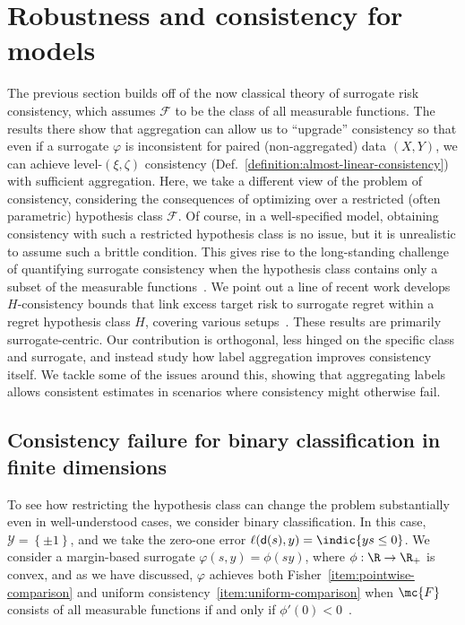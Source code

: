 \documentclass[11pt]{article}
\newcommand{\pred}{\mathsf{d}}  %
\newcommand{\tloss}{\ell}  %
\newcommand{\sloss}{\varphi}  %
\begin{document}
\section{Robustness and consistency for models}

The previous section builds off of the now classical theory of surrogate
risk consistency, which assumes $\mathcal{F}$ to be the class of all
measurable functions.
%
The results there show that aggregation can allow us to ``upgrade''
consistency so that even if a surrogate $\sloss$ is inconsistent for paired
(non-aggregated) data $(X,Y)$, we can achieve level-$(\xi, \zeta)$
consistency (Def.~\ref{definition:almost-linear-consistency}) with
sufficient aggregation.
%
Here, we take a different view of the problem of consistency,
considering the consequences of optimizing over a restricted (often
parametric) hypothesis class $\mathcal{F}$.
%
Of course, in a well-specified model, obtaining consistency with such a
restricted hypothesis class is no issue, but it is unrealistic to
assume such a brittle condition.
%
This gives rise to the long-standing challenge of quantifying surrogate
consistency when the hypothesis class contains only a subset of the
measurable functions~\citep{DuchiKhRu16, NguyenWaJo09}. 
%
We point out a line of recent work develops $H$-consistency bounds that link excess target risk to surrogate regret 
within a regret hypothesis class $H$, covering various setups~\citep{AwasthiMaMoZh22,
AwasthiMaMoZh22b, MaoMoZh23, MaoMoZh24, MaoMoZh25}. These results are primarily surrogate-centric. Our contribution is orthogonal,
less hinged on the specific class and surrogate, and instead study how label aggregation improves consistency itself.
%
We tackle some of the issues around this, showing that
aggregating labels allows consistent estimates in scenarios where
consistency might otherwise fail.

\subsection{Consistency failure for binary classification in
  finite dimensions}
\label{sec:binary-finite-dim}

To see how restricting the hypothesis class can change the problem
substantially even in well-understood cases, we consider binary
classification.
%
In this case, $\mathcal{Y} = \left\{\pm 1\right\}$, and
we take the zero-one error $\tloss(\pred(s), y) = \indic{y s \le 0}$.
%
We consider a margin-based surrogate $\sloss(s, y) = \phi(s y)$, where
$\phi: \R \to \R_+$ is convex, and as we have discussed,
$\sloss$ achieves both Fisher~\eqref{item:pointwise-comparison}
and uniform consistency~\eqref{item:uniform-comparison}
when $\mc{F}$ consists of all measurable functions if and only if
$\phi'(0) < 0$~\citep{BartlettJoMc06}.
\end{document}
